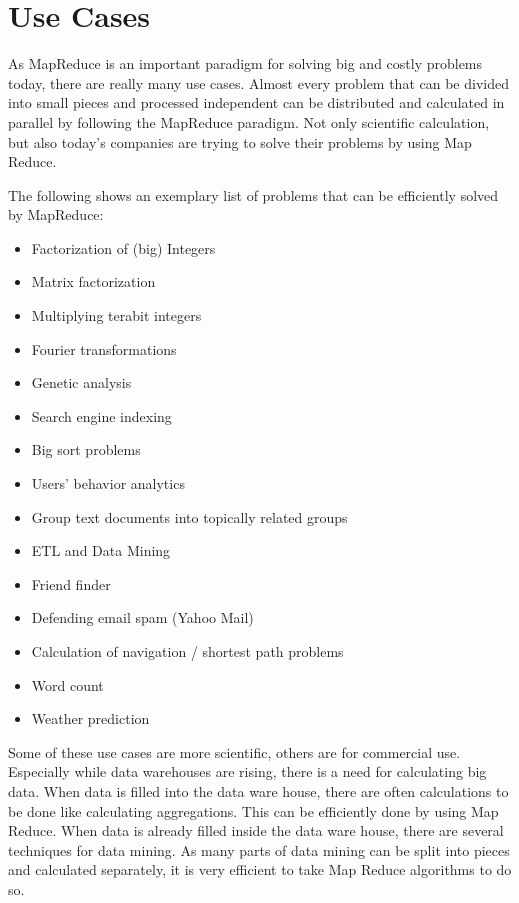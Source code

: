 \chapter{Use Cases}
As MapReduce is an important paradigm for solving big and costly problems today, there are really
many use cases. Almost every problem that can be divided into small pieces and processed independent
can be distributed and calculated in parallel by following the MapReduce paradigm. Not only
scientific calculation, but also today’s companies are trying to solve their problems by using Map
Reduce.

The following shows an exemplary list of problems that can be efficiently solved by MapReduce:
\begin{singlespacing}
	\begin{itemize}
	  \item Factorization of (big) Integers \cite{IntegerFactorization} 
	  \item Matrix factorization \cite{MatrixFactorization} 
	  \item Multiplying terabit integers \cite{TerabitIntegers}
	  \item Fourier transformations
	  \item Genetic analysis \cite{GenomeAnalysis} 
	  \item Search engine indexing
	  \item Big sort problems \cite{OverviewMRAlgorithms} 
	  \item Users' behavior analytics
	  \item Group text documents into topically related groups
	  \item \gls{ETL} and Data Mining
	  \item Friend finder
	  \item Defending email spam (Yahoo Mail) \cite{DefendingMailSpam} 
	  \item Calculation of navigation / shortest path problems \cite{OverviewMRAlgorithms}
	  \item Word count \cite{OverviewMRAlgorithms} 
	  \item Weather prediction 
	\end{itemize}
\end{singlespacing}
 
Some of these use cases are more scientific, others are for commercial use. Especially while data
warehouses are rising, there is a need for calculating big data. When data is filled into the data
ware house, there are often calculations to be done like calculating aggregations. This can be
efficiently done by using Map Reduce. When data is already filled inside the data ware house, there
are several techniques for data mining. As many parts of data mining can be split into pieces and
calculated separately, it is very efficient to take Map Reduce algorithms to do so.

